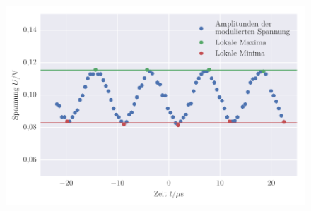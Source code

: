 
\FloatBarrier\begin{figure}[!h]
\centering
\includegraphics[scale=1]{../Grafiken/Amplituden_Modulierte_Spannung_mit_Traeger_Modulationsgrad.pdf}
\caption{\label{fig:amplituden_modulierte_spannung_mit_traeger_modulationsgrad}}
\end{figure}
\FloatBarrier